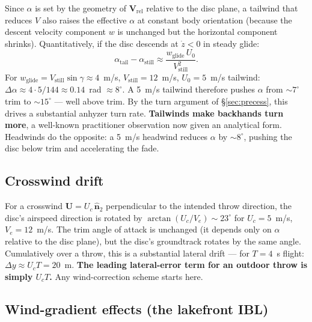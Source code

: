 \documentclass[11pt,letterpaper]{article}
\begin{document}
Since $\alpha$ is set by the geometry of $\mathbf{V}_{\text{rel}}$ relative to the disc plane, a tailwind that reduces $V$ also raises the effective $\alpha$ at constant body orientation (because the descent velocity component $w$ is unchanged but the horizontal component shrinks). Quantitatively, if the disc descends at $\dot{z} < 0$ in steady glide:
\begin{equation}
\alpha_{\text{tail}} - \alpha_{\text{still}} \approx \frac{w_{\text{glide}}\,U_0}{V_{\text{still}}^2}.
\label{eq:alpha-tail}
\end{equation}
For $w_{\text{glide}} = V_{\text{still}} \sin\gamma \approx 4$~m/s, $V_{\text{still}} = 12$~m/s, $U_0 = 5$~m/s tailwind: $\Delta\alpha \approx 4 \cdot 5 / 144 \approx 0.14$~rad $\approx 8^\circ$. A 5~m/s tailwind therefore pushes $\alpha$ from $\sim 7^\circ$ trim to $\sim 15^\circ$ --- well above trim. By the turn argument of \S\ref{sec:precess}, this drives a substantial anhyzer turn rate. \textbf{Tailwinds make backhands turn more}, a well-known practitioner observation now given an analytical form. Headwinds do the opposite: a 5~m/s headwind reduces $\alpha$ by $\sim 8^\circ$, pushing the disc below trim and accelerating the fade.

\subsection{Crosswind drift}

For a crosswind $\mathbf{U} = U_c\,\hat{\mathbf{n}}_2$ perpendicular to the intended throw direction, the disc's airspeed direction is rotated by $\arctan(U_c/V_e) \sim 23^\circ$ for $U_c = 5$~m/s, $V_e = 12$~m/s. The trim angle of attack is unchanged (it depends only on $\alpha$ relative to the disc plane), but the disc's groundtrack rotates by the same angle. Cumulatively over a throw, this is a substantial lateral drift --- for $T = 4$~s flight: $\Delta y \approx U_c T = 20$~m. \textbf{The leading lateral-error term for an outdoor throw is simply $U_c T$.} Any wind-correction scheme starts here.

\subsection{Wind-gradient effects (the lakefront IBL)}
\end{document}
